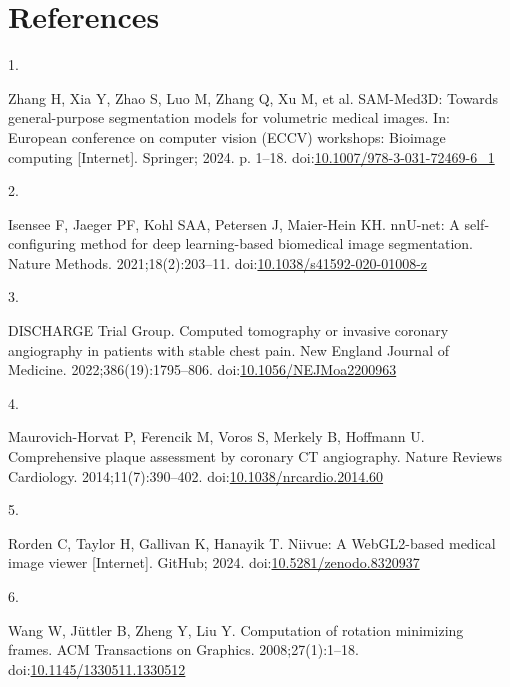 \documentclass[
  11pt,
]{article}
\newlength{\cslhangindent}
\newlength{\csllabelwidth}
\newenvironment{CSLReferences}[2] %
 {\begin{list}{}{%
  \setlength{\itemindent}{0pt}
  \setlength{\leftmargin}{0pt}
  \setlength{\parsep}{0pt}
  \ifodd #1
   \setlength{\leftmargin}{\cslhangindent}
   \setlength{\itemindent}{-1\cslhangindent}
  \fi
  \setlength{\itemsep}{#2\baselineskip}}}
 {\end{list}}
\newcommand{\CSLLeftMargin}[1]{\parbox[t]{\csllabelwidth}{\strut#1\strut}}
\newcommand{\CSLRightInline}[1]{\parbox[t]{\linewidth - \csllabelwidth}{\strut#1\strut}}
\begin{document}
\section*{References}\label{bibliography}

\label{refs}
\begin{CSLReferences}{0}{1}
\CSLLeftMargin{1. }%
\CSLRightInline{Zhang H, Xia Y, Zhao S, Luo M, Zhang Q, Xu M, et al.
SAM-Med3D: Towards general-purpose segmentation models for volumetric
medical images. In: European conference on computer vision (ECCV)
workshops: Bioimage computing {[}Internet{]}. Springer; 2024. p. 1--18.
doi:\href{https://doi.org/10.1007/978-3-031-72469-6_1}{10.1007/978-3-031-72469-6\_1}}

\CSLLeftMargin{2. }%
\CSLRightInline{Isensee F, Jaeger PF, Kohl SAA, Petersen J, Maier-Hein
KH. nnU-net: A self-configuring method for deep learning-based
biomedical image segmentation. Nature Methods. 2021;18(2):203--11.
doi:\href{https://doi.org/10.1038/s41592-020-01008-z}{10.1038/s41592-020-01008-z}}

\CSLLeftMargin{3. }%
\CSLRightInline{DISCHARGE Trial Group. Computed tomography or invasive
coronary angiography in patients with stable chest pain. New England
Journal of Medicine. 2022;386(19):1795--806.
doi:\href{https://doi.org/10.1056/NEJMoa2200963}{10.1056/NEJMoa2200963}}

\CSLLeftMargin{4. }%
\CSLRightInline{Maurovich-Horvat P, Ferencik M, Voros S, Merkely B,
Hoffmann U. Comprehensive plaque assessment by coronary CT angiography.
Nature Reviews Cardiology. 2014;11(7):390--402.
doi:\href{https://doi.org/10.1038/nrcardio.2014.60}{10.1038/nrcardio.2014.60}}

\CSLLeftMargin{5. }%
\CSLRightInline{Rorden C, Taylor H, Gallivan K, Hanayik T. Niivue: A
WebGL2-based medical image viewer {[}Internet{]}. GitHub; 2024.
doi:\href{https://doi.org/10.5281/zenodo.8320937}{10.5281/zenodo.8320937}}

\CSLLeftMargin{6. }%
\CSLRightInline{Wang W, Jüttler B, Zheng Y, Liu Y. Computation of
rotation minimizing frames. ACM Transactions on Graphics.
2008;27(1):1--18.
doi:\href{https://doi.org/10.1145/1330511.1330512}{10.1145/1330511.1330512}}


\end{CSLReferences}
\end{document}
